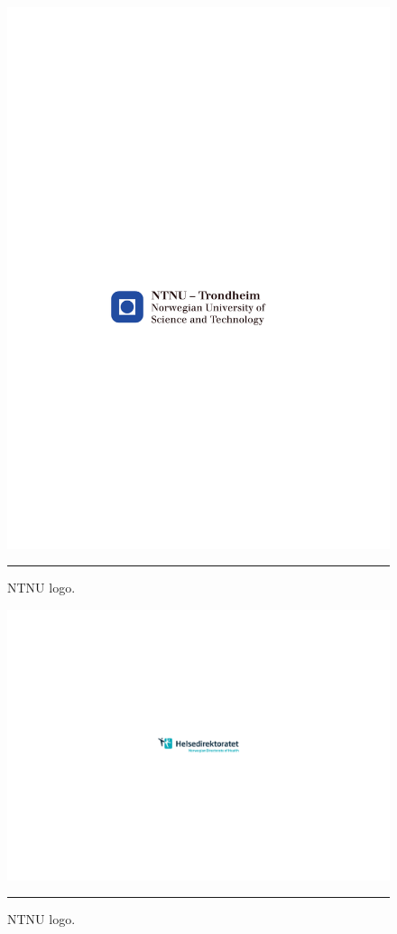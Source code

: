 \documentclass[11pt, a4paper, oneside]{Thesis} %
\begin{document}
\begin{titlepage}
\begin{center}
\begin{figure}[htbp]
  \centering 
   \includegraphics[scale=0.5]{./Figures/NTNU-logo.pdf}
   \rule{35em}{0.5pt}
     \caption[NTNU logo]{NTNU logo.}
  \label{fig:NTNU logo}
\end{figure}

\begin{figure}[htbp]
  \centering
   \includegraphics{./Figures/HDIR-LOGO-HORISONTAL-ENG-CMYK.pdf}
   \rule{35em}{0.5pt}
     \caption[NTNU logo]{NTNU logo.}
  \label{fig:NTNU logo}
\end{figure}


\end{center}

\end{titlepage}
\end{document}
